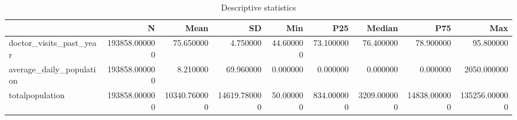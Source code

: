 \begin{table}
\caption{Descriptive statistics}
\label{tab:desc_stats}
\begin{tabular}{lrrrrrrrr}
\toprule
 & N & Mean & SD & Min & P25 & Median & P75 & Max \\
\midrule
doctor_visits_past_year & 193858.000000 & 75.650000 & 4.750000 & 44.600000 & 73.100000 & 76.400000 & 78.900000 & 95.800000 \\
average_daily_population & 193858.000000 & 8.210000 & 69.960000 & 0.000000 & 0.000000 & 0.000000 & 0.000000 & 2050.000000 \\
totalpopulation & 193858.000000 & 10340.760000 & 14619.780000 & 50.000000 & 834.000000 & 3209.000000 & 14838.000000 & 135256.000000 \\
\bottomrule
\end{tabular}
\end{table}

